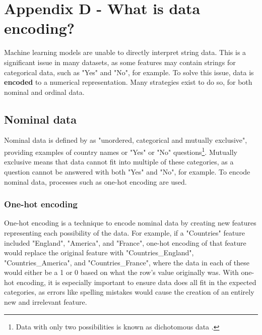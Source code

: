 \begingroup
\renewcommand\thechapter{D}
\titleformat{\chapter}[display]
{\normalfont\huge\bfseries}{}{20pt}{\Huge}
\setcounter{section}{0} %

\chapter*{Appendix D - What is data encoding?}

Machine learning models are unable to directly interpret string data. This is a significant issue 
in many datasets, as some features may contain strings for categorical data, such as "Yes" and "No", for example.
To solve this issue, data is \textbf{encoded} to a numerical representation. Many strategies exist to do so,
for both nominal and ordinal data.

\section{Nominal data}
Nominal data is defined by \textcite{oxford_brookes_university_types_nodate} as "unordered, categorical 
and mutually exclusive", providing examples of country names or "Yes" or "No" questions\footnote{Data with only two possibilities is known as dichotomous data \autocite{oxford_brookes_university_types_nodate}.}.
Mutually exclusive means that data cannot fit into multiple of these categories, as a question cannot be answered with both "Yes" and 
"No", for example. To encode nominal data, processes such as one-hot encoding are used.

\subsection{One-hot encoding}
One-hot encoding is a technique to encode nominal data by creating new features representing each possibility of the data.
For example, if a "Countries" feature included "England", "America", and "France", one-hot encoding of that feature would 
replace the original feature with "Countries\_England", "Countries\_America", and "Countries\_France", where the data in each of these 
would either be a 1 or 0 based on what the row's value originally was. With one-hot encoding, it is especially important to ensure 
data does all fit in the expected categories, as errors like spelling mistakes would cause the creation of an entirely new and 
irrelevant feature.

